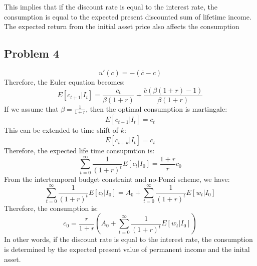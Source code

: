 \documentclass{article}
\begin{document}
This implies that if the discount rate is equal to the interest rate, the consumption is equal to the expected present discounted sum of lifetime income.
The expected return from the initial asset price also affects the consumption

\subsection{Problem 4}
\begin{equation}
    u'(c) = -(\overline{c} - c)
\end{equation}
Therefore, the Euler equation becomes:
\begin{equation}
    E\left[c_{t+1} | I_t\right] = \frac{c_t}{\beta (1+r)} + \frac{\overline{c}(\beta (1+r) - 1)}{\beta (1+r)}
\end{equation}
If we assume that \(\beta = \frac{1}{1+r}\), then the optimal consumption is martingale:
\begin{equation}
    E\left[c_{t+1} | I_t\right] = c_t
\end{equation}
This can be extended to time shift of \(k\):
\begin{equation}
    E\left[c_{t+k} | I_t\right] = c_t
\end{equation}
Therefore, the expected life time consupmtion is:
\begin{equation}
    \sum_{t=0}^{\infty} \frac{1}{(1+r)^t}E\left[c_t|I_0\right] = \frac{1+r}{r} c_0
\end{equation}
From the intertemporal budget constraint and no-Ponzi scheme, we have:
\begin{equation}
    \sum_{t=0}^{\infty} \frac{1}{(1+r)^t} E\left[c_t | I_0\right] = A_0 + \sum_{t=0}^{\infty} \frac{1}{(1+r)^t} E\left[w_t | I_0\right]
\end{equation}
Therefore, the consumption is:
\begin{equation}
    c_0 = \frac{r}{1+r}\left( A_0 + \sum_{t=0}^{\infty} \frac{1}{(1+r)^t} E\left[w_t|I_0\right] \right)
\end{equation}
In other words, if the discount rate is equal to the interest rate, the consumption is determined by the expected present value of permanent income and the inital asset.
\end{document}
